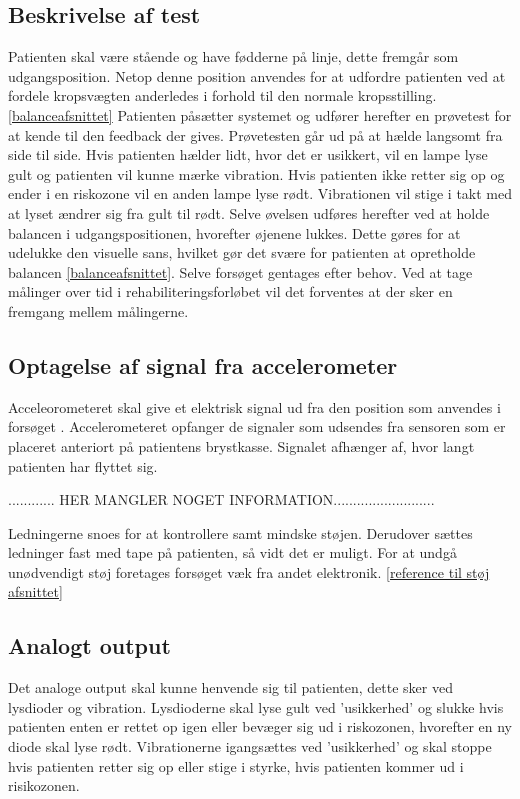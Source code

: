 \subsection{Beskrivelse af test}
Patienten skal være stående og have fødderne på linje, dette fremgår som udgangsposition. Netop denne position anvendes for at udfordre patienten ved at fordele kropsvægten anderledes i forhold til den normale kropsstilling.\ref{balanceafsnittet} Patienten påsætter systemet og udfører herefter en prøvetest for at kende til den feedback der gives. Prøvetesten går ud på at hælde langsomt fra side til side. Hvis patienten hælder lidt, hvor det er usikkert, vil en lampe lyse gult og patienten vil kunne mærke vibration. Hvis patienten ikke retter sig op og ender i en riskozone vil en anden lampe lyse rødt. Vibrationen vil stige i takt med at lyset ændrer sig fra gult til rødt. Selve øvelsen udføres herefter ved at holde balancen i udgangspositionen, hvorefter øjenene lukkes. Dette gøres for at udelukke den visuelle sans, hvilket gør det svære for patienten at opretholde balancen \ref{balanceafsnittet}. Selve forsøget gentages efter behov. 
Ved at tage målinger over tid i rehabiliteringsforløbet vil det forventes at der sker en fremgang mellem målingerne. 

\subsection{Optagelse af signal fra accelerometer}
Acceleorometeret skal give et elektrisk signal ud fra den position som anvendes i forsøget . Accelerometeret opfanger de signaler som udsendes fra sensoren som er placeret anteriort på patientens brystkasse. Signalet afhænger af, hvor langt patienten har flyttet sig. 

............ HER MANGLER NOGET INFORMATION..........................

Ledningerne snoes for at kontrollere samt mindske støjen. Derudover sættes ledninger fast med tape på patienten, så vidt det er muligt. For at undgå unødvendigt støj foretages forsøget væk fra andet elektronik.  \ref{reference til støj afsnittet}



\subsection{Analogt output}
Det analoge output skal kunne henvende sig til patienten, dette sker ved lysdioder og vibration. Lysdioderne skal lyse gult ved 'usikkerhed' og slukke hvis patienten enten er rettet op igen eller bevæger sig ud i riskozonen, hvorefter en ny diode skal lyse rødt. Vibrationerne igangsættes ved 'usikkerhed' og skal stoppe hvis patienten retter sig op eller stige i styrke, hvis patienten kommer ud i risikozonen. 

